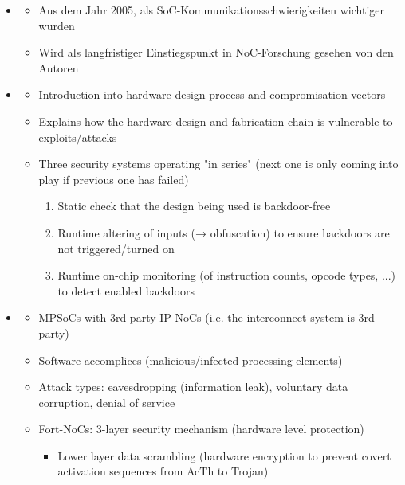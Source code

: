 \begin{itemize}
    \item \textbf{}
        \begin{itemize}
            \item Aus dem Jahr 2005, als SoC-Kommunikationsschwierigkeiten wichtiger wurden
            \item Wird als langfristiger Einstiegspunkt in NoC-Forschung gesehen von den Autoren
        \end{itemize}
    \item \textbf{}
        \begin{itemize}
            \item Introduction into hardware design process and compromisation vectors
            \item Explains how the hardware design and fabrication chain is vulnerable to exploits/attacks
            \item Three security systems operating "in series" (next one is only coming into play if previous one has failed)
                \begin{enumerate}
                    \item Static check that the design being used is backdoor-free
                    \item Runtime altering of inputs (→ obfuscation) to ensure backdoors are not triggered/turned on
                    \item Runtime on-chip monitoring (of instruction counts, opcode types, ...) to detect enabled backdoors
                \end{enumerate}
        \end{itemize}
    \item \textbf{}
        \begin{itemize}
            \item MPSoCs with 3rd party IP NoCs (i.e. the interconnect system is 3rd party)
            \item Software accomplices (malicious/infected processing elements)
            \item Attack types: eavesdropping (information leak), voluntary data corruption, denial of service
            \item Fort-NoCs: 3-layer security mechanism (hardware level protection)
                \begin{itemize}
                    \item Lower layer data scrambling (hardware encryption to prevent covert activation sequences from AcTh to Trojan)

\end{itemize}
\end{itemize}
\end{itemize}
